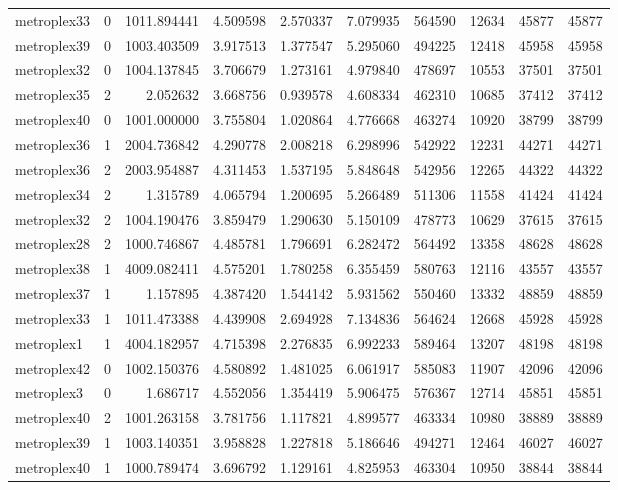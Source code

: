 \documentclass[../../../thesis.tex]{subfiles}
\begin{document}
\begin{longtable}{|l|r|r|r|r|r|r|r|r|r|}
metroplex33 & 0 & 1011.894441 & 4.509598 & 2.570337 & 7.079935 & 564590 & 12634 & 45877 & 45877 \\
metroplex39 & 0 & 1003.403509 & 3.917513 & 1.377547 & 5.295060 & 494225 & 12418 & 45958 & 45958 \\
metroplex32 & 0 & 1004.137845 & 3.706679 & 1.273161 & 4.979840 & 478697 & 10553 & 37501 & 37501 \\
metroplex35 & 2 & 2.052632 & 3.668756 & 0.939578 & 4.608334 & 462310 & 10685 & 37412 & 37412 \\
metroplex40 & 0 & 1001.000000 & 3.755804 & 1.020864 & 4.776668 & 463274 & 10920 & 38799 & 38799 \\
metroplex36 & 1 & 2004.736842 & 4.290778 & 2.008218 & 6.298996 & 542922 & 12231 & 44271 & 44271 \\
metroplex36 & 2 & 2003.954887 & 4.311453 & 1.537195 & 5.848648 & 542956 & 12265 & 44322 & 44322 \\
metroplex34 & 2 & 1.315789 & 4.065794 & 1.200695 & 5.266489 & 511306 & 11558 & 41424 & 41424 \\
metroplex32 & 2 & 1004.190476 & 3.859479 & 1.290630 & 5.150109 & 478773 & 10629 & 37615 & 37615 \\
metroplex28 & 2 & 1000.746867 & 4.485781 & 1.796691 & 6.282472 & 564492 & 13358 & 48628 & 48628 \\
metroplex38 & 1 & 4009.082411 & 4.575201 & 1.780258 & 6.355459 & 580763 & 12116 & 43557 & 43557 \\
metroplex37 & 1 & 1.157895 & 4.387420 & 1.544142 & 5.931562 & 550460 & 13332 & 48859 & 48859 \\
metroplex33 & 1 & 1011.473388 & 4.439908 & 2.694928 & 7.134836 & 564624 & 12668 & 45928 & 45928 \\
metroplex1 & 1 & 4004.182957 & 4.715398 & 2.276835 & 6.992233 & 589464 & 13207 & 48198 & 48198 \\
metroplex42 & 0 & 1002.150376 & 4.580892 & 1.481025 & 6.061917 & 585083 & 11907 & 42096 & 42096 \\
metroplex3 & 0 & 1.686717 & 4.552056 & 1.354419 & 5.906475 & 576367 & 12714 & 45851 & 45851 \\
metroplex40 & 2 & 1001.263158 & 3.781756 & 1.117821 & 4.899577 & 463334 & 10980 & 38889 & 38889 \\
metroplex39 & 1 & 1003.140351 & 3.958828 & 1.227818 & 5.186646 & 494271 & 12464 & 46027 & 46027 \\
metroplex40 & 1 & 1000.789474 & 3.696792 & 1.129161 & 4.825953 & 463304 & 10950 & 38844 & 38844 \\

\end{longtable}
\end{document}
